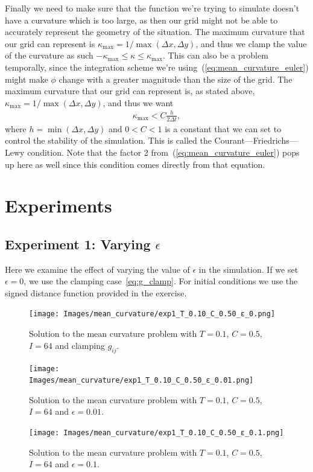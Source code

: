 \documentclass[acmtog]{acmart}
\begin{document}
Finally we need to make sure that the function we're trying to simulate doesn't
have a curvature which is too large, as then our grid might not be able to
accurately represent the geometry of the situation. The maximum curvature that
our grid can represent is $\kappa_\mathrm{max} = 1 / \max(\Delta x, \Delta y)$,
and thus we clamp the value of the curvature as such $-\kappa_\mathrm{max} \leq
  \kappa \leq \kappa_\mathrm{max}$. This can also be a problem temporally, since
the integration scheme we're using~(\ref{eq:mean_curvature_euler}) might make
$\phi$ change with a greater magnitude than the size of the grid. The maximum
curvature that our grid can represent is, as stated above, $\kappa_\mathrm{max}
  = 1 / \max(\Delta x, \Delta y)$, and thus we want
%
\begin{align}
  \kappa_\mathrm{max} < C \frac{h}{2 \Delta t},
\end{align}
%
where $h = \min(\Delta x, \Delta y)$ and $0 < C < 1$ is a constant that we can
set to control the stability of the simulation. This is called the
Courant—Friedrichs—Lewy condition. Note that the factor 2
from~(\ref{eq:mean_curvature_euler}) pops up here as well since this condition
comes directly from that equation.

\section{Experiments}
\subsection{Experiment 1: Varying $\epsilon$}
Here we examine the effect of varying the value of $\epsilon$ in the
simulation. If we set $\epsilon = 0$, we use the clamping
case~\ref{eq:g_clamp}. For initial conditions we use the signed distance
function provided in the exercise.

\begin{figure}[H]
  \centering
  \texttt{[image: Images/mean\_curvature/exp1\_T\_0.10\_C\_0.50\_ε\_0.png]}
  \caption{Solution to the mean curvature problem with $T = 0.1$, $C = 0.5$, $I = 64$ and clamping $g_{ij}$.\label{fig:exp1_eps_0}}
\end{figure}
\begin{figure}[H]
  \centering
  \texttt{[image: Images/mean\_curvature/exp1\_T\_0.10\_C\_0.50\_ε\_0.01.png]}
  \caption{Solution to the mean curvature problem with $T = 0.1$, $C = 0.5$, $I = 64$ and $\epsilon = 0.01$.\label{fig:exp1_eps_0.01}}
\end{figure}
\begin{figure}[H]
  \centering
  \texttt{[image: Images/mean\_curvature/exp1\_T\_0.10\_C\_0.50\_ε\_0.1.png]}
  \caption{Solution to the mean curvature problem with $T = 0.1$, $C = 0.5$, $I = 64$ and $\epsilon = 0.1$.\label{fig:exp1_eps_0.1}}
\end{figure}
\end{document}
